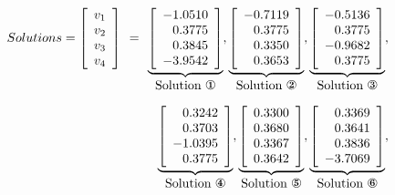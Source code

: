 \documentclass[conference,letterpaper,onecolumn]{IEEEtran}
\begin{document}
\begin{displaymath}
\begin{array}{r}
Solutions=
\left[\begin{array}{r}
v_1 \\ v_2  \\ v_3  \\ v_4  \\
\end{array}\right]
\begin{array}{r}
 \\ = \\ \\ \end{array}
\underbrace{\left[\begin{array}{r}
-1.0510 \\ 0.3775 \\  0.3845\\  -3.9542 \\
\end{array}\right]}_{\mbox{Solution \ding{172}}},
\underbrace{\left[\begin{array}{r}
-0.7119\\0.3775\\ 0.3350\\ 0.3653 \\ 
\end{array}\right]}_{\mbox{Solution \ding{173}}},
\underbrace{\left[\begin{array}{r}
-0.5136\\0.3775\\-0.9682\\0.3775\\
\end{array}\right]}_{\mbox{Solution \ding{174}}}, \\\\
\underbrace{\left[\begin{array}{r}
0.3242\\0.3703\\ -1.0395\\0.3775 \\
\end{array}\right]}_{\mbox{Solution \ding{175}}},
\underbrace{\left[\begin{array}{r}
0.3300 \\ 0.3680 \\ 0.3367 \\ 0.3642 \\
\end{array}\right]}_{\mbox{Solution \ding{176}}},
\underbrace{\left[\begin{array}{r}
0.3369\\ 0.3641\\0.3836\\-3.7069 \\
\end{array}\right]}_{\mbox{Solution \ding{177}}},
\end{array}
\end{displaymath}
\end{document}
